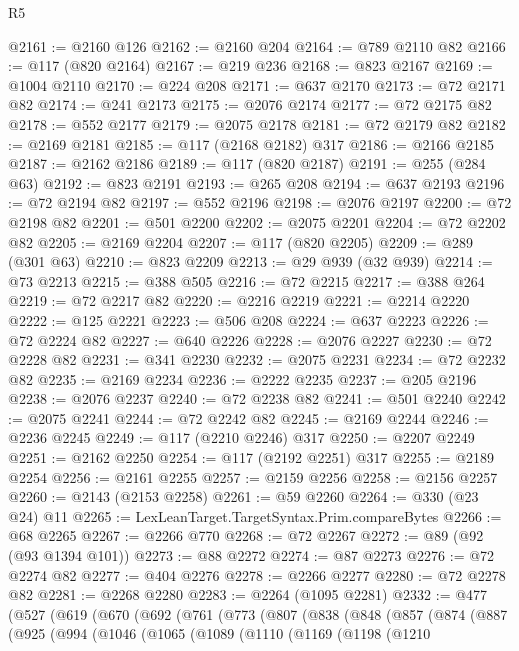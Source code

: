 \begin{lexlean}{R5}
\begin{coremodule}
{{{{{{{{{{{{{{{{{{{{{{{{{{{{{{{{{{{{{{{{{{{{{{{{{{{{{{{{{{{{{{{{{{{{{{{{{{{{{{{{{{{{{{{{{{{{@2161 := @2160 @126
@2162 := @2160 @204
@2164 := @789 @2110 @82
@2166 := @117 (@820 @2164)
@2167 := @219 @236
@2168 := @823 @2167
@2169 := @1004 @2110
@2170 := @224 @208
@2171 := @637 @2170
@2173 := @72 @2171 @82
@2174 := @241 @2173
@2175 := @2076 @2174
@2177 := @72 @2175 @82
@2178 := @552 @2177
@2179 := @2075 @2178
@2181 := @72 @2179 @82
@2182 := @2169 @2181
@2185 := @117 (@2168 @2182) @317
@2186 := @2166 @2185
@2187 := @2162 @2186
@2189 := @117 (@820 @2187)
@2191 := @255 (@284 @63)
@2192 := @823 @2191
@2193 := @265 @208
@2194 := @637 @2193
@2196 := @72 @2194 @82
@2197 := @552 @2196
@2198 := @2076 @2197
@2200 := @72 @2198 @82
@2201 := @501 @2200
@2202 := @2075 @2201
@2204 := @72 @2202 @82
@2205 := @2169 @2204
@2207 := @117 (@820 @2205)
@2209 := @289 (@301 @63)
@2210 := @823 @2209
@2213 := @29 @939 (@32 @939)
@2214 := @73 @2213
@2215 := @388 @505
@2216 := @72 @2215
@2217 := @388 @264
@2219 := @72 @2217 @82
@2220 := @2216 @2219
@2221 := @2214 @2220
@2222 := @125 @2221
@2223 := @506 @208
@2224 := @637 @2223
@2226 := @72 @2224 @82
@2227 := @640 @2226
@2228 := @2076 @2227
@2230 := @72 @2228 @82
@2231 := @341 @2230
@2232 := @2075 @2231
@2234 := @72 @2232 @82
@2235 := @2169 @2234
@2236 := @2222 @2235
@2237 := @205 @2196
@2238 := @2076 @2237
@2240 := @72 @2238 @82
@2241 := @501 @2240
@2242 := @2075 @2241
@2244 := @72 @2242 @82
@2245 := @2169 @2244
@2246 := @2236 @2245
@2249 := @117 (@2210 @2246) @317
@2250 := @2207 @2249
@2251 := @2162 @2250
@2254 := @117 (@2192 @2251) @317
@2255 := @2189 @2254
@2256 := @2161 @2255
@2257 := @2159 @2256
@2258 := @2156 @2257
@2260 := @2143 (@2153 @2258)
@2261 := @59 @2260
@2264 := @330 (@23 @24) @11
@2265 := LexLeanTarget.TargetSyntax.Prim.compareBytes
@2266 := @68 @2265
@2267 := @2266 @770
@2268 := @72 @2267
@2272 := @89 (@92 (@93 @1394 @101))
@2273 := @88 @2272
@2274 := @87 @2273
@2276 := @72 @2274 @82
@2277 := @404 @2276
@2278 := @2266 @2277
@2280 := @72 @2278 @82
@2281 := @2268 @2280
@2283 := @2264 (@1095 @2281)
@2332 := @477
    (@527
      (@619
        (@670
          (@692
            (@761
              (@773
                (@807
                  (@838
                    (@848
                      (@857
                        (@874
                          (@887
                            (@925
                              (@994
                                (@1046
                                  (@1065
                                    (@1089
                                      (@1110
                                        (@1169
                                          (@1198
                                            (@1210
}}}}}}}}}}}}}}}}}}}}}}}}}}}}}}}}}}}}}}}}}}}}}}}}}}}}}}}}}}}}}}}}}}}}}}}}}}}}}}}}}}}}}}}}}}}}
\end{coremodule}
\end{lexlean}
